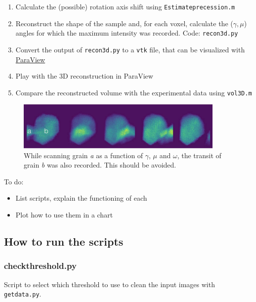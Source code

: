 \documentclass[11pt]{scrartcl}
\begin{document}
\begin{enumerate}
    \item Calculate the (possible) rotation axis shift using {\texttt{Estimate\textunderscore precession.m}}
    \item Reconstruct the shape of the sample and, for each voxel, calculate the ($\gamma, \mu$) angles for which the maximum intensity was recorded. Code: {\texttt{recon3d.py}}
    \item Convert the output of {\texttt{recon3d.py}} to a {\texttt{vtk}} file, that can be visualized with \href{https://www.paraview.org/}{ParaView}
    \item Play with the {\footnotesize{3D}} reconstruction in ParaView
    \item Compare the reconstructed volume with the experimental data using {\texttt{vol3D.m}}
\end{enumerate}

\begin{figure}
    \centering
    \includegraphics[width=0.9\textwidth]{grain_transit}
    \caption{While scanning grain {\emph{a}} as a function of $\gamma$, $\mu$ and $\omega$, the transit of grain {\emph{b}} was also recorded. This should be avoided.}
    \label{fig:grain_transit}
\end{figure}

To do:
\begin{itemize}
\item List scripts, explain the functioning of each
\item Plot how to use them in a chart
\end{itemize}

\subsection{How to run the scripts}

\subsubsection{check\textunderscore threshold.py}

Script to select which threshold to use to clean the input images with {\texttt{getdata.py}}.
\end{document}
